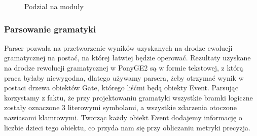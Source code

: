 \begin{figure}[!ht]
	\caption{\label{fig:flow_chart}Podział na moduły}
\end{figure}

\subsubsection{Parsowanie gramatyki}
Parser pozwala na przetworzenie wyników uzyskanych na drodze ewolucji gramatycznej na postać, na której łatwiej będzie operować. Rezultaty uzyskane na drodze rewolucji gramatycznej w PonyGE2 są w formie tekstowej, z którą praca byłaby niewygodna, dlatego używamy parsera, żeby otrzymać wynik w postaci drzewa obiektów Gate, którego liśćmi będą obiekty Event.
Parsując korzystamy z faktu, że przy projektowaniu gramatyki wszystkie bramki logiczne zostały oznaczone 3 literowymi symbolami, a wszystkie zdarzenia otoczone nawiasami klamrowymi. Tworząc każdy obiekt Event dodajemy informację o liczbie dzieci tego obiektu, co przyda nam się przy obliczaniu metryki precyzja.

